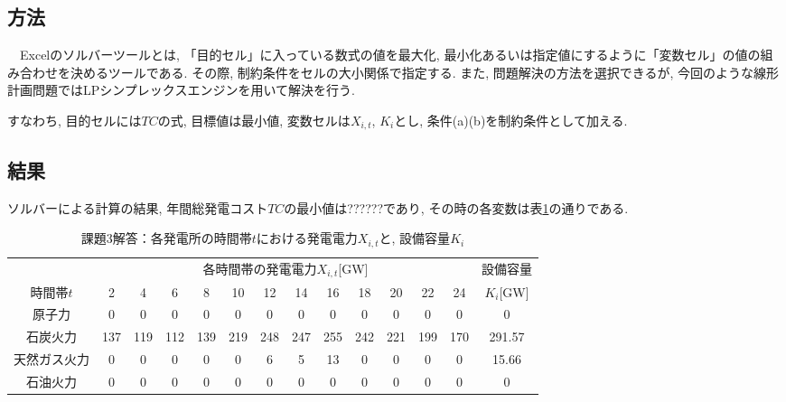 \documentclass[]{jsarticle}
\begin{document}

  \subsection{方法}
      　Excelのソルバーツールとは, 「目的セル」に入っている数式の値を最大化, 最小化あるいは指定値にするように「変数セル」の値の組み合わせを決めるツールである. その際, 制約条件をセルの大小関係で指定する. また, 問題解決の方法を選択できるが, 今回のような線形計画問題ではLPシンプレックスエンジンを用いて解決を行う.

      すなわち, 目的セルには$TC$の式, 目標値は最小値, 変数セルは$X_{i,t}$, $K_i$とし, 条件(a)(b)を制約条件として加える.

  \subsection{結果}
      ソルバーによる計算の結果, 年間総発電コスト$TC$の最小値は??????であり, その時の各変数は表\ref{ans3}の通りである.

      \begin{table}[htb]
        \begin{center}
          \caption{課題3解答：各発電所の時間帯$t$における発電電力$X_{i,t}$と, 設備容量$K_i$}
          \begin{tabular}{|c||c|c|c|c|c|c|c|c|c|c|c|c||c|} \hline
            \multicolumn{1}{|c||}{} & \multicolumn{12}{|c||}{各時間帯の発電電力$X_{i,t}$[GW]} & \multicolumn{1}{|c|}{設備容量} \\ \cline{1-13}
            時間帯$t$ & 2 & 4 & 6 & 8 & 10 & 12 & 14 & 16 & 18 & 20 & 22 & 24 & $K_i$[GW]\\ \hline \hline
            原子力 & 0 & 0 & 0 & 0 & 0 & 0 & 0 & 0 & 0 & 0 & 0 & 0 & 0\\ \hline
            石炭火力 & 137 & 119 & 112 & 139 & 219 & 248 & 247 & 255 & 242 & 221 & 199 & 170 & 291.57\\ \hline
            天然ガス火力 & 0 & 0 & 0 & 0 & 0 & 6 & 5 & 13 & 0 & 0 & 0 & 0 & 15.66 \\ \hline
            石油火力 & 0 & 0 & 0 & 0 & 0 & 0 & 0 & 0 & 0 & 0 & 0 & 0 & 0\\ \hline
          \end{tabular}
          \label{ans3}
        \end{center}
      \end{table}

\end{document}
